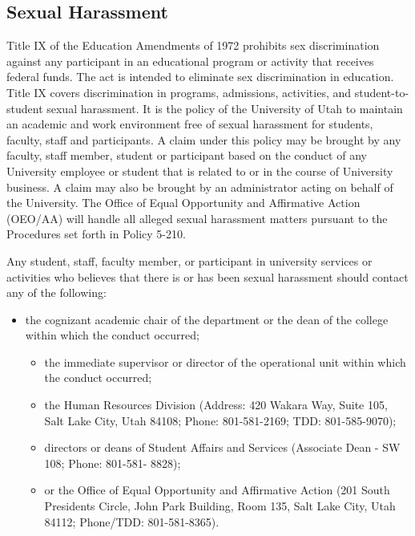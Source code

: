 \documentclass[11pt,]{article}
\providecommand{\tightlist}{%
  \setlength{\itemsep}{0pt}\setlength{\parskip}{0pt}}
\begin{document}
\hypertarget{sexual-harassment}{%
\subsection{Sexual Harassment}\label{sexual-harassment}}

Title IX of the Education Amendments of 1972 prohibits sex
discrimination against any participant in an educational program or
activity that receives federal funds. The act is intended to eliminate
sex discrimination in education. Title IX covers discrimination in
programs, admissions, activities, and student-to-student sexual
harassment. It is the policy of the University of Utah to maintain an
academic and work environment free of sexual harassment for students,
faculty, staff and participants. A claim under this policy may be
brought by any faculty, staff member, student or participant based on
the conduct of any University employee or student that is related to or
in the course of University business. A claim may also be brought by an
administrator acting on behalf of the University. The Office of Equal
Opportunity and Affirmative Action (OEO/AA) will handle all alleged
sexual harassment matters pursuant to the Procedures set forth in Policy
5-210.

Any student, staff, faculty member, or participant in university
services or activities who believes that there is or has been sexual
harassment should contact any of the following:

\begin{itemize}
\tightlist
\item
  the cognizant academic chair of the department or the dean of the
  college within which the conduct occurred;

  \begin{itemize}
  \tightlist
  \item
    the immediate supervisor or director of the operational unit within
    which the conduct occurred;
  \item
    the Human Resources Division (Address: 420 Wakara Way, Suite 105,
    Salt Lake City, Utah 84108; Phone: 801-581-2169; TDD: 801-585-9070);
  \item
    directors or deans of Student Affairs and Services (Associate Dean -
    SW 108; Phone: 801-581- 8828);
  \item
    or the Office of Equal Opportunity and Affirmative Action (201 South
    Presidents Circle, John Park Building, Room 135, Salt Lake City,
    Utah 84112; Phone/TDD: 801-581-8365).
  \end{itemize}
\end{itemize}
\end{document}
